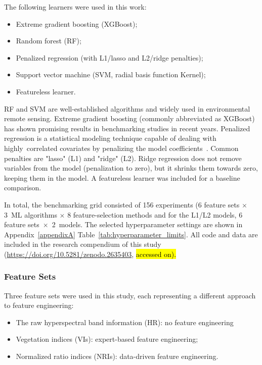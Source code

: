 \documentclass[remotesensing,article,accept,moreauthors,pdftex]{Definitions/mdpi}
\begin{document}
\begin{paracol}{2}
The following learners were used in this work:

\begin{itemize}
	\item  Extreme gradient boosting (XGBoost);
	\item  Random forest (RF);
	\item  Penalized regression (with L1/lasso and L2/ridge penalties);
	\item  Support vector machine (SVM, radial basis function Kernel);
	\item  Featureless learner.
\end{itemize}

RF and SVM are well-established algorithms and widely used in environmental remote sensing.
Extreme gradient boosting (commonly abbreviated as XGBoost) has shown promising results in benchmarking studies in recent years.
Penalized regression is a statistical modeling technique capable of dealing with highly\ correlated covariates by penalizing the model coefficients~\cite{hastie2001}.
Common penalties are "lasso" (L1) and "ridge" (L2).
Ridge regression does not remove variables from the model (penalization to zero), but it shrinks them towards zero, keeping them in the model.
A featureless learner was included for a baseline comparison.

In total, the benchmarking grid consisted of 156 experiments (6 feature sets $\times$ 3~ML algorithms $\times$ 8 feature-selection methods and for the L1/L2 models, 6 feature sets~$\times$~2~models.
The selected hyperparameter settings are shown in Appendix~\ref{appendixA} Table~\ref{tab:hyperparameter_limits}.
All code and data are included in the research compendium of this study (\url{https://doi.org/10.5281/zenodo.2635403}, \hl{accessed on).} %


\subsubsection{Feature Sets}

Three feature sets were used in this study, each representing a different approach to feature engineering:

\begin{itemize}
	\item The raw hyperspectral band information (HR): no feature engineering %
	\item Vegetation indices (\ac{VI}s): expert-based feature engineering;
	\item Normalized ratio indices (\ac{NRI}s): data-driven feature engineering.
\end{itemize}


\end{paracol}
\end{document}
